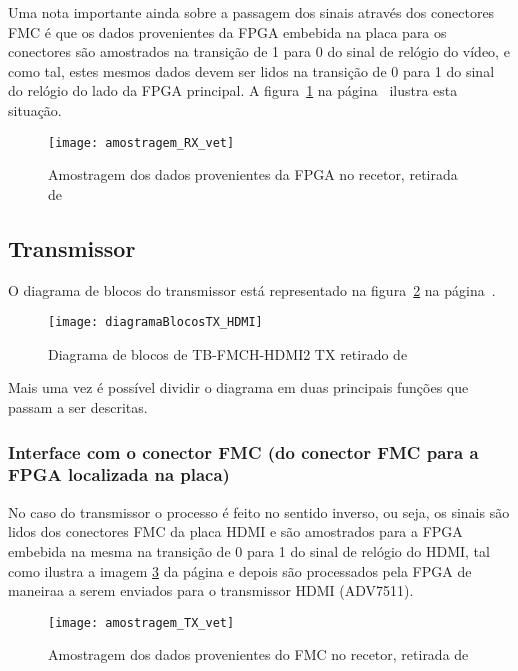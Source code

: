 Uma nota importante ainda sobre a passagem dos sinais através dos conectores FMC é que os dados provenientes da FPGA embebida na placa para os conectores são amostrados na transição de 1 para 0 do sinal de relógio do vídeo, e como tal, estes mesmos dados devem ser lidos na transição de 0 para 1 do sinal do relógio do lado da FPGA principal. A figura~\ref{fig:HDMIamostragemRX} na página~\pageref{fig:HDMIamostragemRX} ilustra esta situação.

\begin{figure}[h!]
	\begin{center}
		\leavevmode
		\texttt{[image: amostragem\_RX\_vet]}
		\caption{Amostragem dos dados provenientes da FPGA no recetor, retirada de \cite{R009}}
		\label{fig:HDMIamostragemRX}
	\end{center}
\end{figure}
 


\subsection{Transmissor}\label{subsec:TX} 

O diagrama de blocos do transmissor está representado na figura~\ref{fig:HDMIblocosTX} na página~\pageref{fig:HDMIblocosTX}.
\begin{figure}[h!]
	\begin{center}
		\leavevmode
		\texttt{[image: diagramaBlocosTX\_HDMI]}
		\caption{Diagrama de blocos de TB-FMCH-HDMI2 TX retirado de \cite{R009}}
		\label{fig:HDMIblocosTX}
	\end{center}
\end{figure}
Mais uma vez é possível dividir o diagrama em duas principais funções que passam a ser descritas.

\subsubsection{Interface com o conector FMC (do conector FMC para a FPGA localizada na placa)}
No caso do transmissor o processo é feito no sentido inverso, ou seja, os sinais são lidos dos conectores FMC da placa HDMI e são amostrados para a FPGA embebida na mesma na transição de 0 para 1 do sinal de relógio do HDMI, tal como ilustra a imagem \ref{fig:HDMIamostragemTX} da página \pageref{fig:HDMIamostragemTX} e depois são processados pela FPGA de maneiraa a serem enviados para o transmissor HDMI (ADV7511).

	\begin{figure}[h!]
	\begin{center}
		\leavevmode
		\texttt{[image: amostragem\_TX\_vet]}
		\caption{Amostragem dos dados provenientes do FMC no recetor, retirada de \cite{R009}}
		\label{fig:HDMIamostragemTX}
	\end{center}
\end{figure}


